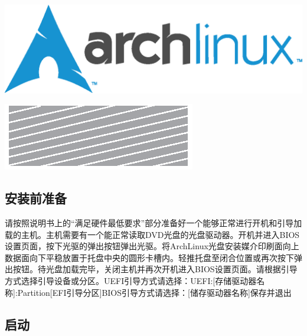 \documentclass{article}
\newenvironment{singlecolumn}{%
	\par
	\noindent
	\begin{minipage}[t]{\textwidth} %
		\setlength{\parfillskip}{0pt plus 1fil} %
	}{%
	\end{minipage}
	\par
}
\begin{document}
\begin{singlecolumn}
	\vspace*{1\baselineskip}
	\noindent
\begin{minipage}[t]{0.48\textwidth} %
	\includegraphics[width=\linewidth]{assets/archlinux-logo-with-text.eps}
\end{minipage}
	\hfill
\begin{minipage}[t]{0.5\textwidth}
	\raggedleft
	\includegraphics[width=\linewidth]{assets/header-background1.2.eps}
\end{minipage}
\vspace{\baselineskip}
\begin{tcolorbox}
\section*{安装前准备}
\end{tcolorbox}

请按照说明书上的“满足硬件最低要求”部分准备好一个能够正常进行开机和引导加载的主机。主机需要有一个能正常读取DVD光盘的光盘驱动器。开机并进入BIOS设置页面，按下光驱的弹出按钮弹出光驱。将ArchLinux光盘安装媒介印刷面向上数据面向下平稳放置于托盘中央的圆形卡槽内。轻推托盘至闭合位置或再次按下弹出按钮。待光盘加载完毕，关闭主机并再次开机进入BIOS设置页面。请根据引导方式选择引导设备或分区。\textcolor{uefi}{UEFI引导方式请选择：UEFI:[存储驱动器名称]:Partition[EFI引导分区]}\textcolor{bios}{BIOS引导方式请选择：[储存驱动器名称]保存并退出}

\medskip

\begin{tcolorbox}
	\section*{启动}
\end{tcolorbox}


\end{singlecolumn}
\end{document}
